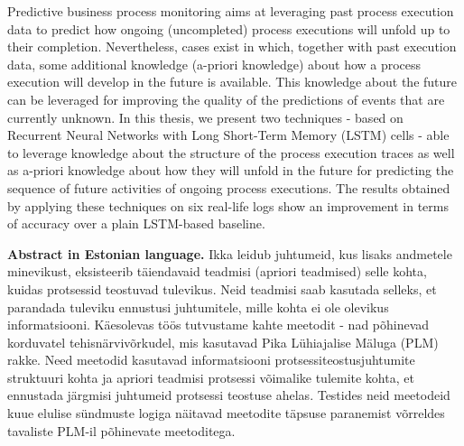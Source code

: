 Predictive business process monitoring aims at leveraging past process execution data to predict how ongoing (uncompleted) process executions will unfold up to
their completion.
Nevertheless, cases exist in which, together with past
execution data, some additional knowledge (a-priori
knowledge) about how a process execution will develop in the future is available. This knowledge about the future can be leveraged for
improving the quality of the predictions of events that are currently unknown. In this thesis, we present two
techniques - based on Recurrent Neural Networks with Long Short-Term Memory (LSTM) cells - able to
leverage knowledge about the structure of the process execution traces as well as a-priori knowledge about how they will unfold in the future for predicting the sequence of future activities of ongoing process executions. The results obtained by applying these techniques on six real-life logs show an improvement in terms of accuracy over a plain
LSTM-based baseline.
\par
\par
\textbf{Abstract in Estonian language.} Ikka leidub juhtumeid, kus lisaks andmetele minevikust, eksisteerib täiendavaid teadmisi (apriori teadmised) selle kohta, kuidas protsessid teostuvad tulevikus. Neid teadmisi saab kasutada selleks, et parandada tuleviku ennustusi juhtumitele, mille kohta ei ole olevikus informatsiooni. Käesolevas töös tutvustame kahte meetodit - nad põhinevad korduvatel tehisnärvivõrkudel, mis kasutavad Pika Lühiajalise Mäluga (PLM) rakke. Need meetodid kasutavad informatsiooni protsessiteostusjuhtumite struktuuri kohta ja apriori teadmisi protsessi võimalike tulemite kohta, et ennustada järgmisi juhtumeid protsessi teostuse ahelas. Testides neid meetodeid kuue elulise sündmuste logiga näitavad meetodite täpsuse paranemist võrreldes tavaliste PLM-il põhinevate meetoditega.

